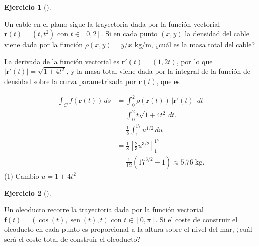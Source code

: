 \documentclass[
  spanish,
  a4paper,
]{scrreport}
\theoremstyle{definition}
\newtheorem{exercise}{Ejercicio}[chapter]
\theoremstyle{remark}
\begin{document}
\begin{exercise}[]\protect\hypertarget{exr-densidad-cable}{}\label{exr-densidad-cable}

Un cable en el plano sigue la trayectoria dada por la función vectorial
\(\mathbf{r}(t)=(t, t^2)\) con \(t\in [0,2]\). Si en cada punto
\((x, y)\) la densidad del cable viene dada por la función
\(\rho(x,y)=y/x\) kg/m, ¿cuál es la masa total del cable?

\end{exercise}

\begin{tcolorbox}[enhanced jigsaw, arc=.35mm, bottomrule=.15mm, bottomtitle=1mm, breakable, colback=white, colbacktitle=quarto-callout-tip-color!10!white, colframe=quarto-callout-tip-color-frame, coltitle=black, left=2mm, leftrule=.75mm, opacityback=0, opacitybacktitle=0.6, rightrule=.15mm, title=\textcolor{quarto-callout-tip-color}{\faLightbulb}\hspace{0.5em}{Solución}, titlerule=0mm, toprule=.15mm, toptitle=1mm]

La derivada de la función vectorial es \(\mathbf{r}'(t) = (1, 2t)\), por
lo que \(|\mathbf{r}'(t)|=\sqrt{1+4t^2}\), y la masa total viene dada
por la integral de la función de densidad sobre la curva parametrizada
por \(\mathbf{r}(t)\), que es

\begin{align*}
\int_C f(\mathbf{r}(t))\, ds 
&= \int_0^2 \rho(\mathbf{r}(t))\,|\mathbf{r}'(t)|\,dt \\
&=\int_0^2 t\sqrt{1+4t^2}\,dt.\\
&= \frac{1}{8}\int_{1}^{17} u^{1/2}\,du \tag {1} \\
&=\frac{1}{8}\left[\frac{2}{3}u^{3/2}\right]_{1}^{17} \\
&=\frac{1}{12}\left(17^{3/2}-1\right)
\approx 5.76\ \text{kg}.
\end{align*} (1) Cambio \(u = 1+4t^2\)

\end{tcolorbox}

\begin{exercise}[]\protect\hypertarget{exr-coste-oleoducto}{}\label{exr-coste-oleoducto}

Un oleoducto recorre la trayectoria dada por la función vectorial
\(\mathbf{f}(t)=(\cos(t), \operatorname{sen}(t), t)\) con
\(t\in [0,\pi]\). Si el coste de construir el oleoducto en cada punto es
proporcional a la altura sobre el nivel del mar, ¿cuál será el coste
total de construir el oleoducto?

\end{exercise}
\end{document}
